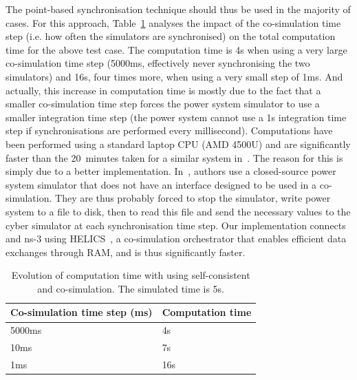 The point-based synchronisation technique should thus be used in the majority of cases. For this approach, Table~\ref{tab:CosimComputationTime} analyses the impact of the co-simulation time step (i.e. how often the simulators are synchronised) on the total computation time for the above test case. The computation time is 4s when using a very large co-simulation time step (5000ms, effectively never synchronising the two simulators) and 16s, four times more, when using a very small step of 1ms. And actually, this increase in computation time is mostly due to the fact that a smaller co-simulation time step forces the power system simulator to use a smaller integration time step (the power system cannot use a 1s integration time step if synchronisations are performed every millisecond). Computations have been performed using a standard laptop CPU (AMD 4500U) and are significantly faster than the 20~minutes taken for a similar system in~\cite{GECOcomputationTime}. The reason for this is simply due to a better implementation. In~\cite{GECOcomputationTime}, authors use a closed-source power system simulator that does not have an interface designed to be used in a co-simulation. They are thus probably forced to stop the simulator, write power system to a file to disk, then to read this file and send the necessary values to the cyber simulator at each synchronisation time step. Our implementation connects \Dynawo{} and ns-3 using HELICS~\cite{HELICS}, a co-simulation orchestrator that enables efficient data exchanges through RAM, and is thus significantly faster.

\begin{table}
\centering
\caption{Evolution of computation time with using self-consistent and co-simulation. The simulated time is 5s.}
\begin{tabular}{@{}ll@{}}
\toprule
Co-simulation time step (ms) & Computation time \\ \midrule
5000ms                       & 4s               \\
10ms                         & 7s               \\
1ms                          & 16s              \\ \bottomrule
\end{tabular}
\label{tab:CosimComputationTime}
\end{table}
